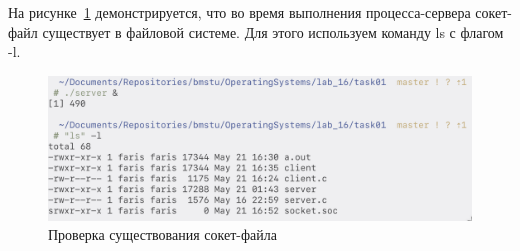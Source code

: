 На рисунке~\ref{img:check01} демонстрируется, что во время выполнения процесса-сервера сокет-файл существует в файловой системе. Для этого используем команду ls с флагом -l.

\begin{figure}[H]
    \centering
    \includegraphics[scale=0.35]{images/check01.png}
    \caption{Проверка существования сокет-файла}\label{img:check01}
\end{figure}

